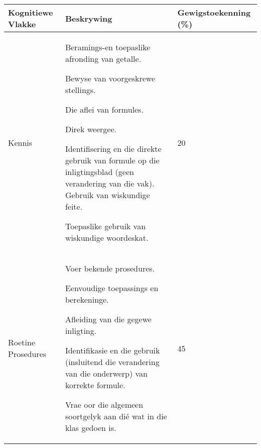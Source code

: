 \begin{table}[H]
\begin{center}
\begin{tabular} {|p{3cm}|p{7cm}|p{1.5cm}|} \hline
\textbf{Kognitiewe Vlakke} & \textbf{Beskrywing} & \textbf{Gewigstoekenning (\%)} \\ \hline
Kennis & 
Beramings-en toepaslike afronding van getalle. \par 
Bewyse van voorgeskrewe stellings. \par 
Die aflei van formules. \par 
Direk weergee. \par 
Identifisering en die direkte gebruik van formule op die inligtingsblad (geen verandering van die vak). Gebruik van wiskundige feite. \par 
Toepaslike gebruik van wiskundige woordeskat.
& 
20 \\ \hline

Roetine Prosedures & 
Voer bekende prosedures. \par 
Eenvoudige toepassings en berekeninge. \par 
Afleiding van die gegewe inligting. \par 
Identifikasie en die gebruik (insluitend die verandering van die onderwerp) van korrekte formule. \par 
Vrae oor die algemeen soortgelyk aan dié wat in die klas gedoen is.
&
45 \\ \hline


\end{tabular}
\end{center}
\end{table}
